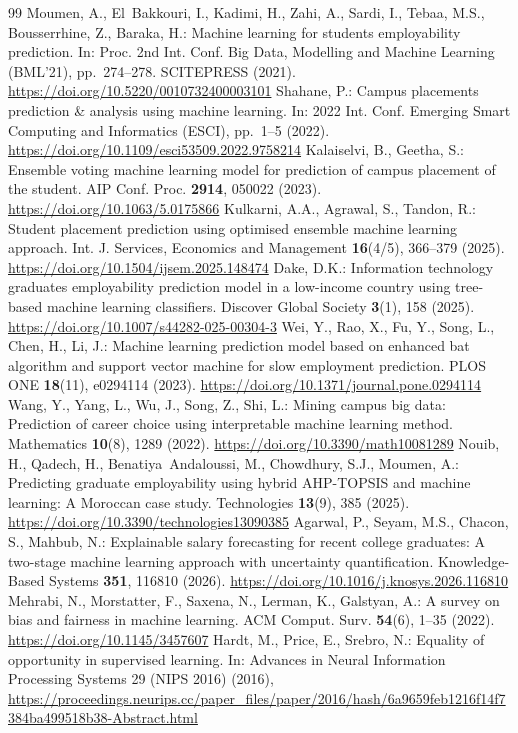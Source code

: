 \documentclass[runningheads]{llncs}
\providecommand{\doi}[1]{\url{https://doi.org/#1}}
\begin{document}
\begin{thebibliography}{99}
 Moumen, A., El~Bakkouri, I., Kadimi, H., Zahi, A., Sardi, I., Tebaa, M.S., Bousserrhine, Z., Baraka, H.: Machine learning for students employability prediction. In: Proc. 2nd Int. Conf. Big Data, Modelling and Machine Learning (BML'21), pp.~274--278. SCITEPRESS (2021). \doi{10.5220/0010732400003101}
 Shahane, P.: Campus placements prediction \& analysis using machine learning. In: 2022 Int. Conf. Emerging Smart Computing and Informatics (ESCI), pp.~1--5 (2022). \doi{10.1109/esci53509.2022.9758214}
 Kalaiselvi, B., Geetha, S.: Ensemble voting machine learning model for prediction of campus placement of the student. AIP Conf. Proc. \textbf{2914}, 050022 (2023). \doi{10.1063/5.0175866}
 Kulkarni, A.A., Agrawal, S., Tandon, R.: Student placement prediction using optimised ensemble machine learning approach. Int. J. Services, Economics and Management \textbf{16}(4/5), 366--379 (2025). \doi{10.1504/ijsem.2025.148474}
 Dake, D.K.: Information technology graduates employability prediction model in a low-income country using tree-based machine learning classifiers. Discover Global Society \textbf{3}(1), 158 (2025). \doi{10.1007/s44282-025-00304-3}
 Wei, Y., Rao, X., Fu, Y., Song, L., Chen, H., Li, J.: Machine learning prediction model based on enhanced bat algorithm and support vector machine for slow employment prediction. PLOS ONE \textbf{18}(11), e0294114 (2023). \doi{10.1371/journal.pone.0294114}
 Wang, Y., Yang, L., Wu, J., Song, Z., Shi, L.: Mining campus big data: Prediction of career choice using interpretable machine learning method. Mathematics \textbf{10}(8), 1289 (2022). \doi{10.3390/math10081289}
 Nouib, H., Qadech, H., Benatiya~Andaloussi, M., Chowdhury, S.J., Moumen, A.: Predicting graduate employability using hybrid AHP-TOPSIS and machine learning: A Moroccan case study. Technologies \textbf{13}(9), 385 (2025). \doi{10.3390/technologies13090385}
 Agarwal, P., Seyam, M.S., Chacon, S., Mahbub, N.: Explainable salary forecasting for recent college graduates: A two-stage machine learning approach with uncertainty quantification. Knowledge-Based Systems \textbf{351}, 116810 (2026). \doi{10.1016/j.knosys.2026.116810}
 Mehrabi, N., Morstatter, F., Saxena, N., Lerman, K., Galstyan, A.: A survey on bias and fairness in machine learning. ACM Comput. Surv. \textbf{54}(6), 1--35 (2022). \doi{10.1145/3457607}
 Hardt, M., Price, E., Srebro, N.: Equality of opportunity in supervised learning. In: Advances in Neural Information Processing Systems 29 (NIPS 2016) (2016), \url{https://proceedings.neurips.cc/paper_files/paper/2016/hash/6a9659feb1216f14f7384ba499518b38-Abstract.html}

\end{thebibliography}
\end{document}
